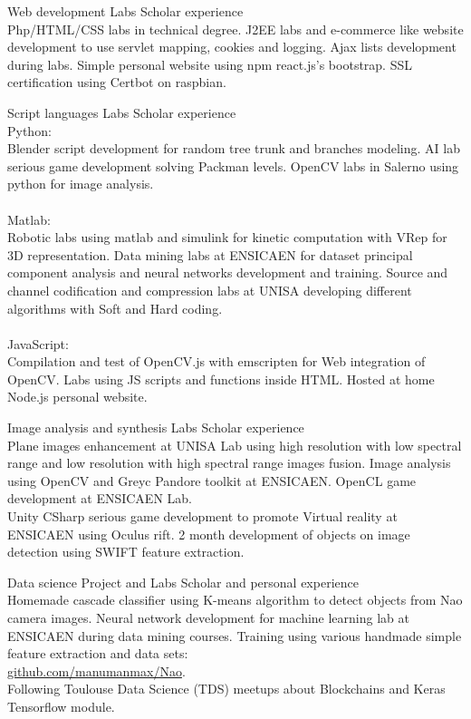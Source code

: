 \documentclass{tccv-master/tccv}
\begin{document}
\begin{eventlist}
\item{Web development}
{Labs}
{Scholar experience}\\
Php/HTML/CSS labs in technical degree.
J2EE labs and e-commerce like website development to use servlet mapping, cookies and logging.
Ajax lists development during labs.
Simple personal website using npm react.js's bootstrap.
SSL certification using Certbot on raspbian.

\item{Script languages}
{Labs}
{Scholar experience}\\
Python: \\
Blender script development for random tree trunk and branches modeling. 
AI lab serious game development solving Packman levels.
OpenCV labs in Salerno using python for image analysis.\\\\
Matlab:\\
Robotic labs using matlab and simulink for kinetic computation with VRep for 3D representation.
Data mining labs at ENSICAEN for dataset principal component analysis and neural networks development and training.
Source and channel codification and compression labs at UNISA developing different algorithms with Soft and Hard coding.\\\\
JavaScript:\\
Compilation and test of OpenCV.js with emscripten for Web integration of OpenCV.
Labs using JS scripts and functions inside HTML.
Hosted at home Node.js personal website.

\item
{Image analysis and synthesis}
{Labs}
{Scholar experience}\\
Plane images enhancement at UNISA Lab using high resolution with low spectral range and low resolution with high spectral range images fusion.
Image analysis using OpenCV and Greyc Pandore toolkit at ENSICAEN.
OpenCL game development at ENSICAEN Lab.\\
Unity CSharp serious game development to promote Virtual reality at ENSICAEN using Oculus rift. 2 month development of objects on image detection using SWIFT feature extraction.

\item
{Data science}
{Project and Labs}
{Scholar and personal experience}\\
Homemade cascade classifier using K-means algorithm to detect objects from Nao camera images.
Neural network development for machine learning lab at ENSICAEN during data mining courses.
Training using various handmade simple feature extraction and data sets:\\
\href{https://github.com/manumanmax/Nao}{github.com/manumanmax/Nao}.\\
Following Toulouse Data Science (TDS) meetups about Blockchains and Keras Tensorflow module.


\end{eventlist}
\end{document}
